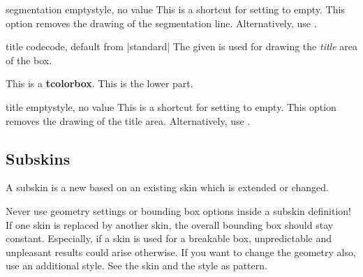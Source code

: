 \begin{docTcbKey}{segmentation empty}{}{style, no value}
  This is a shortcut for setting   to empty.
  This option removes the drawing of the segmentation line.
  Alternatively, use .
\end{docTcbKey}



\begin{docTcbKey}{title code}{}{code, default from |standard|}
  The given  is used for drawing the
  \emph{title} area of the box.
\begin{dispExample}

\begin{tcolorbox}[enhanced,title=My title,title code={
  \path[draw=yellow,solid,decorate,line width=2mm,
    decoration={coil,aspect=0,segment length=10.1mm}]
    ([xshift=1mm]title.west) -- ([xshift=-1mm]title.east);}]
This is a \textbf{tcolorbox}.
\tcblower
This is the lower part.
\end{tcolorbox}
\end{dispExample}
\end{docTcbKey}


\begin{docTcbKey}{title empty}{}{style, no value}
  This is a shortcut for setting   to empty.
  This option removes the drawing of the title area.
  Alternatively, use .
\end{docTcbKey}

\subsection{Subskins}\label{subsec:subskins}
A subskin is a new  based on an existing skin which
is extended or changed.

\begin{marker}
Never use geometry settings or bounding box options inside a subskin definition!
If one skin is replaced by another skin, the overall bounding box should stay
constant. Especially, if a skin is used for a breakable box, unpredictable
and unpleasant results could arise otherwise. If you want to change the
geometry also, use an additional style. See the skin  and
the style  as pattern.
\end{marker}

